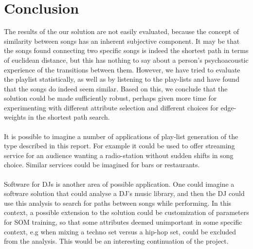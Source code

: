 \section{Conclusion} %
\label{sec:applications}
The results of the our solution are not easily evaluated, because the concept of similarity between songs has an inherent subjective component. It may be that the songs found connecting two specific songs is indeed the shortest path in terms of euclidean distance, but this has nothing to say about a person's psychoacoustic experience of the transitions between them. However, we have tried to evaluate the playlist statistically, as well as by listening to the play-lists and have found that the songs do indeed seem similar. Based on this, we conclude that the solution could be made sufficiently robust, perhaps given more time for experimenting with different attribute selection and different choices for edge-weights in the shortest path search.
\\\\
It is possible to imagine a number of applications of play-list generation of the type described in this report. For example it could be used to offer streaming service for an audience wanting a radio-station without sudden shifts in song choice. Similar services could be imagined for bars or restaurants.
\\\\
Software for DJs is another area of possible application. One could imagine a software solution that could analyse a DJ's music library, and then the DJ could use this analysis to search for paths between songs while performing. In this context, a possible extension to the solution could be customization of parameters for SOM training, so that some attributes deemed unimportant in some specific context, e.g when mixing a techno set versus a hip-hop set, could be excluded from the analysis. This would be an interesting continuation of the project.

